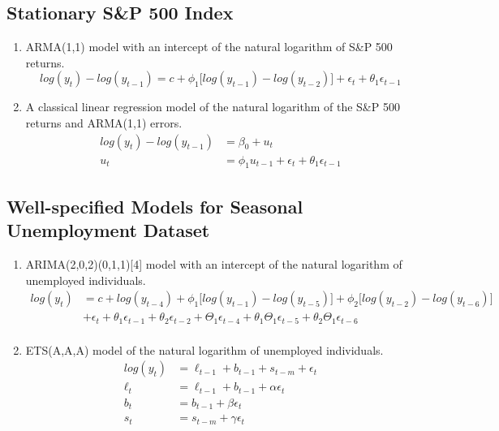 \documentclass{monashthesis}
\begin{document}
\hypertarget{stationary-sp-500-index}{%
\subsection{Stationary S\&P 500 Index}\label{stationary-sp-500-index}}

\begin{enumerate}
\def\labelenumi{\arabic{enumi}.}
\item
  ARMA(1,1) model with an intercept of the natural logarithm of S\&P 500 returns.
  \begin{equation*}
  log(y_t) - log(y_{t-1}) = c + \phi_1\big[log(y_{t-1})-log(y_{t-2})\big] + \epsilon_t + \theta_1\epsilon_{t-1}
  \end{equation*}
\item
  A classical linear regression model of the natural logarithm of the S\&P 500 returns and ARMA(1,1) errors.
  \begin{align*}
  log(y_t) - log(y_{t-1}) &= \beta_0 + u_t \\
  u_t &= \phi_1 u_{t-1} + \epsilon_t + \theta_1\epsilon_{t-1}
  \end{align*}
\end{enumerate}

\hypertarget{well-specified-models-for-seasonal-unemployment-dataset}{%
\subsection{Well-specified Models for Seasonal Unemployment Dataset}\label{well-specified-models-for-seasonal-unemployment-dataset}}

\begin{enumerate}
\def\labelenumi{\arabic{enumi}.}
\item
  ARIMA(2,0,2)(0,1,1){[}4{]} model with an intercept of the natural logarithm of unemployed individuals.
  \begin{align*}
  log(y_t) &= c + log(y_{t-4}) + \phi_1\big[log(y_{t-1})-log(y_{t-5})\big] + \phi_2\big[log(y_{t-2})-log(y_{t-6})\big] \\
        &+ \epsilon_t + \theta_1\epsilon_{t-1} + \theta_2\epsilon_{t-2} + \Theta_1\epsilon_{t-4} + \theta_1\Theta_1\epsilon_{t-5} + \theta_2\Theta_1\epsilon_{t-6} \\
  \end{align*}
\item
  ETS(A,A,A) model of the natural logarithm of unemployed individuals.
  \begin{align*}
  log(y_t) &= \ell_{t-1} + b_{t-1} + s_{t-m} + \epsilon_t \\
  \ell_t &= \ell_{t-1} + b_{t-1} + \alpha \epsilon_t \\
  b_t &= b_{t-1} + \beta \epsilon_t \\
  s_{t} &= s_{t-m} + \gamma \epsilon_t
  \end{align*}
\end{enumerate}
\end{document}
